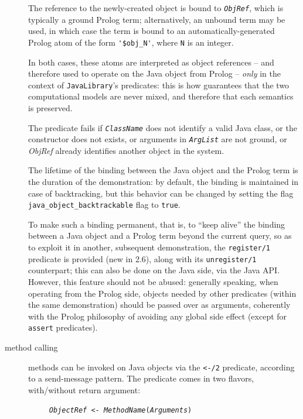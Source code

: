 \begin{description}
        The reference to the newly-created object is bound to \texttt{\textit{ObjRef}},
        which is typically a ground Prolog term; alternatively, an unbound term
        may be used, in which case the term is bound to an automatically-generated
        Prolog atom of the form \verb|'$obj_N'|, where \texttt{N} is an integer.

        In both cases, these atoms are interpreted as object references --
        and therefore used to operate on the Java object from Prolog -- \textit{only} in the context of \texttt{JavaLibrary}'s predicates: this is how \tuprolog{} guarantees that the two computational models are never mixed, and therefore that each semantics is preserved.

        The predicate fails if \texttt{\textit{ClassName}} does not identify a valid Java class, or the constructor does not exists, or arguments in
        \texttt{\textit{ArgList}} are not ground, or \textit{ObjRef}
        already identifies another object in the system.

        The lifetime of the binding between the Java object and the Prolog term
        is the duration of the demonstration: by default, the binding is maintained in case of backtracking, but this behavior can be changed by setting the flag \texttt{java\_object\_backtrackable} flag to \texttt{true}.

        To make such a binding permanent, that is, to ``keep alive'' the binding between a Java object and a Prolog term beyond the current query, so as to exploit it in another, subsequent demonstration, the \texttt{register/1} predicate is provided (new in \tuprolog{} 2.6), along with its \texttt{unregister/1} counterpart;
        this can also be done on the Java side, via the \tuprolog{} Java API.
        However, this feature should not be abused: generally speaking, when operating from the Prolog side, objects needed by other predicates (within the same demonstration) should be passed over as arguments, coherently with the Prolog philosophy of avoiding any global side effect (except for \texttt{assert} predicates).

  \item [method calling]
        methods can be invoked on Java objects via the \texttt{<-/2} predicate,
        according to a send-message pattern. The predicate comes in two flavors, with/without return argument:

        \texttt{~~~~~\textit{ObjectRef} <- \textit{MethodName}(\textit{Arguments})}


\end{description}
